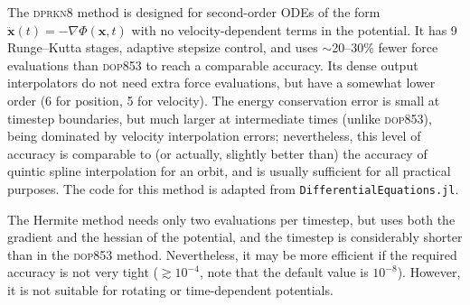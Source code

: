 \documentclass[12pt]{article}
\begin{document}
The \textsc{dprkn8} method is designed for second-order ODEs of the form $\ddot{\boldsymbol x}(t) = -\nabla\Phi(\boldsymbol x, t)$ with no velocity-dependent terms in the potential. It has 9 Runge--Kutta stages, adaptive stepsize control, and uses $\sim$20--30\% fewer force evaluations than \textsc{dop853} to reach a comparable accuracy. Its dense output interpolators do not need extra force evaluations, but have a somewhat lower order (6 for position, 5 for velocity). The energy conservation error is small at timestep boundaries, but much larger at intermediate times (unlike \textsc{dop853}), being dominated by velocity interpolation errors; nevertheless, this level of accuracy is comparable to (or actually, slightly better than) the accuracy of quintic spline interpolation for an orbit, and is usually sufficient for all practical purposes. The code for this method is adapted from \texttt{DifferentialEquations.jl}.

The Hermite method needs only two evaluations per timestep, but uses both the gradient and the hessian of the potential, and the timestep is considerably shorter than in the \textsc{dop853} method. Nevertheless, it may be more efficient if the required accuracy is not very tight ($\gtrsim 10^{-4}$, note that the default value is $10^{-8}$). However, it is not suitable for rotating or time-dependent potentials.
\end{document}
